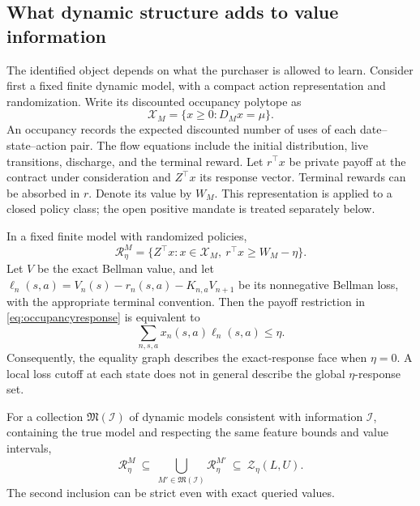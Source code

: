 \subsection{What dynamic structure adds to value information}
\label{sec:informationhierarchy}
The identified object depends on what the purchaser is allowed to learn. Consider first a fixed finite dynamic model, with a compact action representation and randomization. Write its discounted occupancy polytope as
\[
 \mathcal X_M=\{x\geq0:D_Mx=\mu\}.
\]
An occupancy records the expected discounted number of uses of each date--state--action pair. The flow equations include the initial distribution, live transitions, discharge, and the terminal reward. Let $r^\top x$ be private payoff at the contract under consideration and $Z^\top x$ its response vector. Terminal rewards can be absorbed in $r$. Denote its value by $W_M$. This representation is applied to a closed policy class; the open positive mandate is treated separately below.

\begin{theorem}
\label{thm:occupancy}
In a fixed finite model with randomized policies,
\begin{equation}
 \mathcal R^M_\eta
 =\{Z^\top x:x\in\mathcal X_M,\ r^\top x\geq W_M-\eta\}.
 \label{eq:occupancyresponse}
\end{equation}
Let $V$ be the exact Bellman value, and let
$\ell_n(s,a)=V_n(s)-r_n(s,a)-K_{n,a}V_{n+1}$ be its nonnegative Bellman loss, with the appropriate terminal convention. Then the payoff restriction in \eqref{eq:occupancyresponse} is equivalent to
\begin{equation}
 \sum_{n,s,a}x_n(s,a)\ell_n(s,a)\leq\eta.
 \label{eq:globalloss}
\end{equation}
Consequently, the equality graph describes the exact-response face when $\eta=0$. A local loss cutoff at each state does not in general describe the global $\eta$-response set.

For a collection $\mathfrak M(\mathcal I)$ of dynamic models consistent with information $\mathcal I$, containing the true model and respecting the same feature bounds and value intervals,
\begin{equation}
 \mathcal R^M_\eta\ \subseteq\
 \bigcup_{M'\in\mathfrak M(\mathcal I)}\mathcal R^{M'}_\eta
 \ \subseteq\ \mathcal Z_\eta(L,U).
 \label{eq:informationnesting}
\end{equation}
The second inclusion can be strict even with exact queried values.
\end{theorem}

